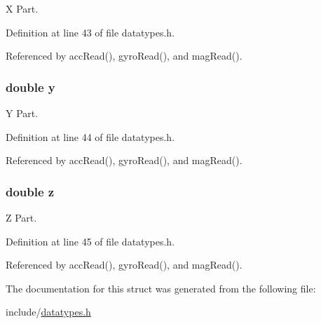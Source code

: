 X Part. 



Definition at line 43 of file datatypes.\-h.



Referenced by acc\-Read(), gyro\-Read(), and mag\-Read().

\hypertarget{struct_vector3f_ab927965981178aa1fba979a37168db2a}{
\subsubsection[{y}]{\setlength{\rightskip}{0pt plus 5cm}double y}}\label{struct_vector3f_ab927965981178aa1fba979a37168db2a}


Y Part. 



Definition at line 44 of file datatypes.\-h.



Referenced by acc\-Read(), gyro\-Read(), and mag\-Read().

\hypertarget{struct_vector3f_ab3e6ed577a7c669c19de1f9c1b46c872}{
\subsubsection[{z}]{\setlength{\rightskip}{0pt plus 5cm}double z}}\label{struct_vector3f_ab3e6ed577a7c669c19de1f9c1b46c872}


Z Part. 



Definition at line 45 of file datatypes.\-h.



Referenced by acc\-Read(), gyro\-Read(), and mag\-Read().



The documentation for this struct was generated from the following file\-:\begin{DoxyCompactItemize}
\item 
include/\hyperlink{datatypes_8h}{datatypes.\-h}\end{DoxyCompactItemize}
